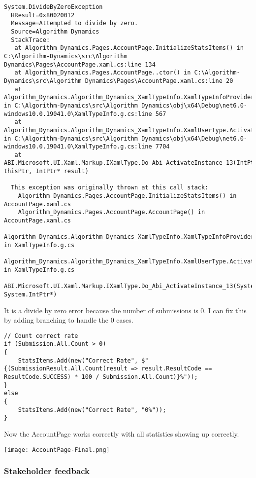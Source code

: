 \documentclass[report.tex]{subfiles}
\begin{document}
\begin{verbatim}
System.DivideByZeroException
  HResult=0x80020012
  Message=Attempted to divide by zero.
  Source=Algorithm Dynamics
  StackTrace:
   at Algorithm_Dynamics.Pages.AccountPage.InitializeStatsItems() in C:\Algorithm-Dynamics\src\Algorithm Dynamics\Pages\AccountPage.xaml.cs:line 134
   at Algorithm_Dynamics.Pages.AccountPage..ctor() in C:\Algorithm-Dynamics\src\Algorithm Dynamics\Pages\AccountPage.xaml.cs:line 20
   at Algorithm_Dynamics.Algorithm_Dynamics_XamlTypeInfo.XamlTypeInfoProvider.Activate_59_AccountPage() in C:\Algorithm-Dynamics\src\Algorithm Dynamics\obj\x64\Debug\net6.0-windows10.0.19041.0\XamlTypeInfo.g.cs:line 567
   at Algorithm_Dynamics.Algorithm_Dynamics_XamlTypeInfo.XamlUserType.ActivateInstance() in C:\Algorithm-Dynamics\src\Algorithm Dynamics\obj\x64\Debug\net6.0-windows10.0.19041.0\XamlTypeInfo.g.cs:line 7704
   at ABI.Microsoft.UI.Xaml.Markup.IXamlType.Do_Abi_ActivateInstance_13(IntPtr thisPtr, IntPtr* result)

  This exception was originally thrown at this call stack:
    Algorithm_Dynamics.Pages.AccountPage.InitializeStatsItems() in AccountPage.xaml.cs
    Algorithm_Dynamics.Pages.AccountPage.AccountPage() in AccountPage.xaml.cs
    Algorithm_Dynamics.Algorithm_Dynamics_XamlTypeInfo.XamlTypeInfoProvider.Activate_59_AccountPage() in XamlTypeInfo.g.cs
    Algorithm_Dynamics.Algorithm_Dynamics_XamlTypeInfo.XamlUserType.ActivateInstance() in XamlTypeInfo.g.cs
    ABI.Microsoft.UI.Xaml.Markup.IXamlType.Do_Abi_ActivateInstance_13(System.IntPtr, System.IntPtr*)
\end{verbatim}

It is a divide by zero error because the number of submissions is 0. I can fix this by adding branching to handle the 0 cases.

\begin{verbatim}
// Count correct rate
if (Submission.All.Count > 0)
{
    StatsItems.Add(new("Correct Rate", $"{(SubmissionResult.All.Count(result => result.ResultCode == ResultCode.SUCCESS) * 100 / Submission.All.Count)}%"));
}
else
{
    StatsItems.Add(new("Correct Rate", "0%"));
}
\end{verbatim}

Now the AccountPage works correctly with all statistics showing up correctly.

\texttt{[image: AccountPage-Final.png]}

\subsubsection{Stakeholder feedback}
\end{document}
